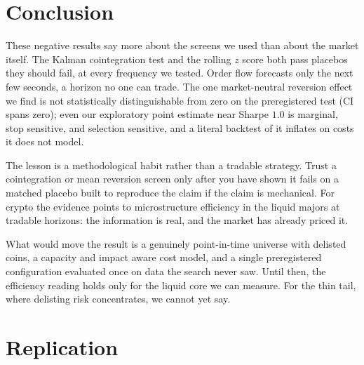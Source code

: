 \documentclass[11pt]{article}
\begin{document}
\section{Conclusion}
\label{sec:conclusion}

These negative results say more about the screens we used than about the market itself. The Kalman cointegration test and the rolling
$z$ score both pass placebos they should fail, at every frequency we tested. Order flow forecasts
only the next few seconds, a horizon no one can trade. The one market-neutral reversion effect
we find is not statistically distinguishable from zero on the preregistered test (CI spans zero);
even our exploratory point estimate near Sharpe $1.0$ is marginal, stop sensitive, and selection
sensitive, and a literal backtest of it inflates on costs it does not model.

The lesson is a methodological habit rather than a tradable strategy. Trust a cointegration or
mean reversion screen only after you have shown it fails on a matched placebo built to reproduce
the claim if the claim is mechanical. For crypto the evidence points to microstructure efficiency in the liquid majors at
tradable horizons: the information is real, and the market has already priced it.

What would move the result is a genuinely point-in-time universe with delisted coins, a capacity and impact aware cost model, and a single preregistered configuration evaluated once on data the
search never saw. Until then, the efficiency reading holds only for the liquid core we can measure. For the thin tail,
where delisting risk concentrates, we cannot yet say.

\section*{Replication}
\label{sec:replication}
\end{document}

